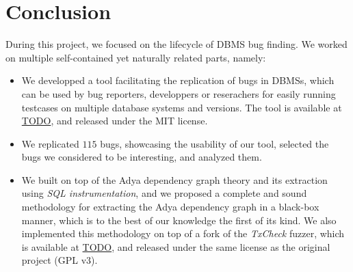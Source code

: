 \chapter{Conclusion}

During this project, we focused on the lifecycle of DBMS bug finding. We worked on multiple self-contained yet naturally related parts, namely:

\begin{itemize}
    \item We developped a tool facilitating the replication of bugs in DBMSs, which can be used by bug reporters, developpers or reserachers for easily running testcases on multiple database systems and versions. The tool is available at \url{TODO}, and released under the MIT license.
    \item We replicated $115$ bugs, showcasing the usability of our tool, selected the bugs we considered to be interesting, and analyzed them. 
    \item We built on top of the Adya dependency graph theory and its extraction using \textit{SQL instrumentation}, and we proposed a complete and sound methodology for extracting the Adya dependency graph in a black-box manner, which is to the best of our knowledge the first of its kind. We also implemented this methodology on top of a fork of the \textit{TxCheck} fuzzer, which is available at \url{TODO}, and released under the same license as the original project (GPL v3). 
\end{itemize}


